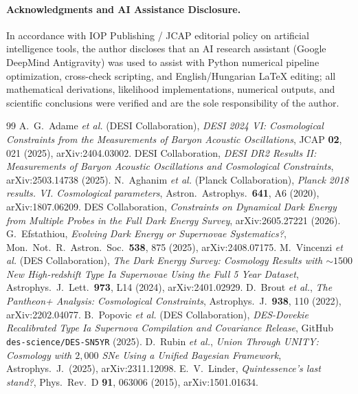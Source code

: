 \documentclass[11pt,a4paper]{article}
\begin{document}
\paragraph{Acknowledgments and AI Assistance Disclosure.} In accordance with IOP Publishing / JCAP editorial policy on artificial intelligence tools, the author discloses that an AI research assistant (Google DeepMind Antigravity) was used to assist with Python numerical pipeline optimization, cross-check scripting, and English/Hungarian LaTeX editing; all mathematical derivations, likelihood implementations, numerical outputs, and scientific conclusions were verified and are the sole responsibility of the author.

\begin{thebibliography}{99}
 A.~G.~Adame \textit{et al.} (DESI Collaboration), \textit{DESI 2024 VI: Cosmological Constraints from the Measurements of Baryon Acoustic Oscillations}, JCAP \textbf{02}, 021 (2025), arXiv:2404.03002.
 DESI Collaboration, \textit{DESI DR2 Results II: Measurements of Baryon Acoustic Oscillations and Cosmological Constraints}, arXiv:2503.14738 (2025).
 N.~Aghanim \textit{et al.} (Planck Collaboration), \textit{Planck 2018 results. VI. Cosmological parameters}, Astron.\ Astrophys.\ \textbf{641}, A6 (2020), arXiv:1807.06209.
 DES Collaboration, \textit{Constraints on Dynamical Dark Energy from Multiple Probes in the Full Dark Energy Survey}, arXiv:2605.27221 (2026).
 G.~Efstathiou, \textit{Evolving Dark Energy or Supernovae Systematics?}, Mon.\ Not.\ R.\ Astron.\ Soc.\ \textbf{538}, 875 (2025), arXiv:2408.07175.
 M.~Vincenzi \textit{et al.} (DES Collaboration), \textit{The Dark Energy Survey: Cosmology Results with $\sim 1500$ New High-redshift Type Ia Supernovae Using the Full 5 Year Dataset}, Astrophys.\ J.\ Lett.\ \textbf{973}, L14 (2024), arXiv:2401.02929.
 D.~Brout \textit{et al.}, \textit{The Pantheon+ Analysis: Cosmological Constraints}, Astrophys.\ J.\ \textbf{938}, 110 (2022), arXiv:2202.04077.
 B.~Popovic \textit{et al.} (DES Collaboration), \textit{DES-Dovekie Recalibrated Type Ia Supernova Compilation and Covariance Release}, GitHub \texttt{des-science/DES-SN5YR} (2025).
 D.~Rubin \textit{et al.}, \textit{Union Through UNITY: Cosmology with $2,000$ SNe Using a Unified Bayesian Framework}, Astrophys.\ J.\ (2025), arXiv:2311.12098.
 E.~V.~Linder, \textit{Quintessence's last stand?}, Phys.\ Rev.\ D \textbf{91}, 063006 (2015), arXiv:1501.01634.

\end{thebibliography}
\end{document}
